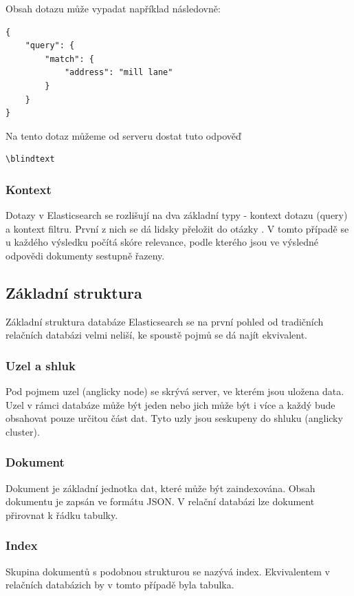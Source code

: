 Obsah dotazu může vypadat například následovně:
\begin{verbatim}
{
    "query": {
        "match": {
            "address": "mill lane"
        }
    }
}
\end{verbatim}

Na tento dotaz můžeme od serveru dostat tuto odpověď
\begin{verbatim}
\blindtext
\end{verbatim} 

\subsubsection*{Kontext}
Dotazy v Elasticsearch se rozlišují na dva základní typy - kontext dotazu (query) a kontext filtru.
První z nich se dá lidsky přeložit do otázky . V tomto případě se u každého výsledku počítá skóre relevance, podle kterého jsou ve výsledné odpovědi dokumenty sestupně řazeny.


\subsection{Základní struktura}
Základní struktura databáze Elasticsearch se na první pohled od tradičních relačních databázi velmi neliší, ke spoustě pojmů se dá najít ekvivalent.

\subsubsection*{Uzel a shluk}
Pod pojmem uzel (anglicky node) se skrývá server, ve kterém jsou uložena data. Uzel v rámci databáze může být jeden nebo jich může být i více a každý bude obsahovat pouze určitou část dat. Tyto uzly jsou seskupeny do shluku (anglicky cluster).


\subsubsection*{Dokument}
Dokument je základní jednotka dat, které může být zaindexována. Obsah dokumentu je zapsán ve formátu JSON. V relační databázi lze dokument přirovnat k řádku tabulky.

\subsubsection*{Index}
Skupina dokumentů s podobnou strukturou se nazývá index. Ekvivalentem v relačních databázich by v tomto případě byla tabulka.


